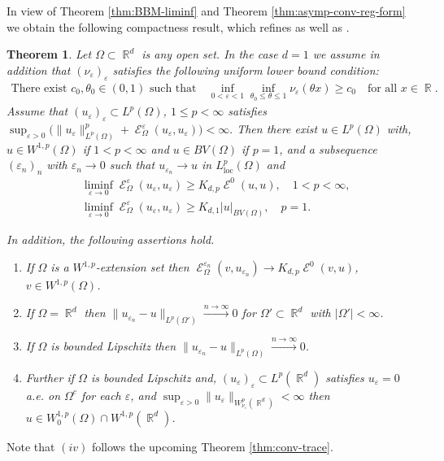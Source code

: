 \documentclass[12pt, reqno]{amsart}%
\theoremstyle{plain}  %
\newtheorem{theorem}{Theorem}[section]
\theoremstyle{definition}  %
\numberwithin{equation}{section}
\DeclareMathOperator{\loc}{loc}
\DeclareMathOperator{\cE}{\mathcal{E}}
\DeclareMathOperator{\R}{\mathbb{R}}
\newcommand{\eps}{\varepsilon}
\begin{document}
\vspace{1mm}
\par  In view of Theorem \ref{thm:BBM-liminf} and Theorem \ref{thm:asymp-conv-reg-form} we obtain the following compactness result, which refines \cite[Theorem 5.35 \& 5.40]{guy-thesis} as well as \cite[Theorem 1.2]{Pon04}.
\begin{theorem}\label{thm:asymp-compactness}
Let $\Omega\subset \R^d$ is any open set. In the case $d=1$ we assume in addition that $(\nu_\eps)_\eps$ satisfies the following uniform lower bound condition:
\begin{align*}
\text{There exist $c_0, \theta_0 \in (0,1)$ such that}
\quad
\inf_{0 < \varepsilon < 1} \inf_{\theta_0 \leq \theta \leq 1} \nu_\varepsilon(\theta x) \geq c_0
\quad \text{for all } x \in \R.
\end{align*}
 Assume that  $(u_\eps)_\eps\subset L^p(\Omega)$, $1\leq p<\infty$ satisfies
$\sup_{\eps>0} \big(\|u_\eps\|^p_{L^p(\Omega)}+ \cE^\eps_\Omega(u_\eps,u_\eps) \big)<\infty.$
\noindent Then there exist $u\in L^p(\Omega)$ with,  $u\in W^{1,p}(\Omega)$ if $1<p<\infty$ and  $u\in BV(\Omega)$ if $p=1$, and a subsequence $(\eps_n)_n$ with $\eps_n\to0$ such that $u_{\eps_n}\to u $ in $ L^p_{\loc}(\Omega)$ and
\begin{align*}
& \liminf_{\eps\to0}\cE^{\eps}_\Omega( u_\eps, u_\eps) \geq K_{d,p} \cE^{0}( u, u),\quad 1<p<\infty,\\
&\liminf_{\eps\to0}\cE^{\eps}_\Omega( u_\eps, u_\eps) \geq K_{d,1} |u|_{BV(\Omega)},\quad p=1.
\end{align*}

\noindent 	In addition, the following  assertions hold.
%
\begin{enumerate}[$(i)$]
\item  If $\Omega$ is a $W^{1,p}$-extension set then $\cE^{\eps_n}_\Omega( v, u_{\eps_n}) \to K_{d,p} \cE^{0}( v, u)$, $v\in W^{1,p}(\Omega)$.
\item If $\Omega=\R^d$ then  $\|u_{\eps_n}-u\|_{L^p(\Omega')}\xrightarrow{n\to\infty}0$ for $\Omega'\subset \R^d $ with   $|\Omega'|<\infty$.
\item If $\Omega$ is bounded Lipschitz  then  $\|u_{\eps_n}-u\|_{L^p(\Omega)}\xrightarrow{n\to\infty}0$.
\item Further if $\Omega$ is bounded Lipschitz  and,  $(u_\eps)_\eps\subset L^p(\R^d)$ satisfies $u_\eps=0$ a.e. on $\Omega^c$ for each $\eps$, and $\sup_{\eps>0}\|u_\eps\|_{ W^p_{\nu_\eps}(\R^d)}<\infty$ then $ u\in W^{1,p}_0(\Omega)\cap W^{1,p}(\R^d)$.
\end{enumerate}
\end{theorem}
Note that $(iv)$ follows the upcoming Theorem \ref{thm:conv-trace}.
\end{document}
